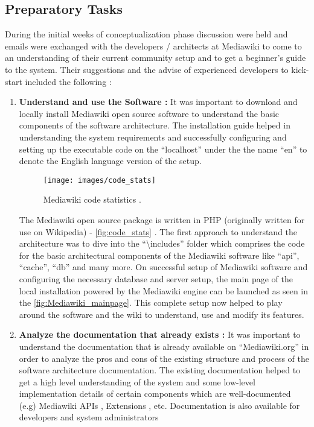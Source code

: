 \subsection{Preparatory Tasks}
\indent During the initial weeks of conceptualization phase discussion were held and emails were exchanged with the developers / architects at Mediawiki to come to an understanding of their current community setup and to get a beginner's guide to the system. Their suggestions and the advise of experienced developers to kick-start included the following :
\begin{enumerate}
\item \textbf{Understand and use the Software : } It was important to download and locally install Mediawiki open source software to understand the basic components of the software architecture. The installation guide \cite{Installation_guide} helped in understanding the system requirements and successfully configuring and setting up the executable code on the \enquote{localhost} under the the name \enquote{en} to denote the English language version of the setup. 
\begin{figure}[H]
  \centering
  \texttt{[image: images/code\_stats]}
  \caption[Mediawiki code statistics \cite{openhub_MW}]{Mediawiki code statistics \cite{openhub_MW}.}\label{fig:code_stats}
\end{figure}
The Mediawiki open source package is written in PHP \cite{mediawiki} (originally written for use on Wikipedia) - \autoref{fig:code_stats} \cite{openhub_MW}. The first approach to understand the architecture was to dive into the \enquote{\textbackslash{includes}} folder which comprises the code for the basic architectural components of the Mediawiki software like \enquote{api}, \enquote{cache}, \enquote{db} and many more. 
\indent On successful setup of Mediawiki software and configuring the necessary database and server setup, the main page of the local installation powered by the Mediawiki engine can be launched as seen in the \autoref{fig:Mediawiki_mainpage}.
This complete setup now helped to play around the software and the wiki to understand, use and modify its features.
\item \textbf{Analyze the documentation that already exists : } It was important to understand the documentation that is already available on \enquote{Mediawiki.org} in order to analyze the pros and cons of the existing structure and process of the software architecture documentation. The existing documentation helped to get a high level understanding of the system and some low-level implementation details of certain components which are well-documented (e.g) Mediawiki APIs \cite{api_tutorial}, Extensions \cite{manual_extensions}, etc. Documentation is also available for developers and system administrators \cite{MW_doc}

\end{enumerate}
